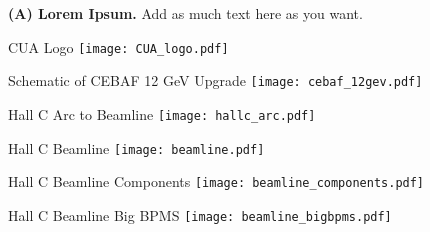 
{\textbf{(A) Lorem Ipsum.} Add as much text here as you want.}

\begin{Mfigure}{CUA Logo}
 \centering
 \texttt{[image: CUA\_logo.pdf]}
\label{fig:titlepagelogo}
\end{Mfigure}

%
%

\begin{Mfigure}{Schematic of CEBAF 12 GeV Upgrade}
  \centering
  \texttt{[image: cebaf\_12gev.pdf]}
  \caption{Schematic of CEBAF 12 GeV Upgrade \cite{pilat_12_2012}.}
  \label{fig:2-1_cebaf12gev}
\end{Mfigure}

%
%

\begin{Mfigure}{Hall C Arc to Beamline}
  \centering
  \texttt{[image: hallc\_arc.pdf]}
  \caption{The Hall C arc which steers the beam to the beamline \cite{yero_cross_2020}. Electron synchrotron radiation loss is shown with the yellow arrows.}
  \label{fig:2-2_hallc_arc}
\end{Mfigure}

\begin{Mfigure}{Hall C Beamline}
  \centering
  \texttt{[image: beamline.pdf]}
  \caption{Hall C beamline from entrance of hall to the target scattering chamber \cite{sta_jeerson_2019}.}
  \label{fig:2-2_beamline}
\end{Mfigure}

\begin{Mfigure}{Hall C Beamline Components}
  \centering
  \texttt{[image: beamline\_components.pdf]}
  \caption{The Hall C beamline components from entrance of hall to the target scattering chamber \cite{yero_cross_2020}. The relevant distances from the scattering chamber are labeled.}
  \label{fig:2-2_beamline_components}
\end{Mfigure}

\begin{Mfigure}{Hall C Beamline Big BPMS}
  \centering
  \texttt{[image: beamline\_bigbpms.pdf]}
  \caption{Schematic of the Hall C beamline downstream, showing the Big BPMs (IPM3H08, IPM3H09) near the beam dump. \cite{sta_jeerson_2019}.}
  \label{fig:2-2_beamline_bigbpms}
\end{Mfigure} 